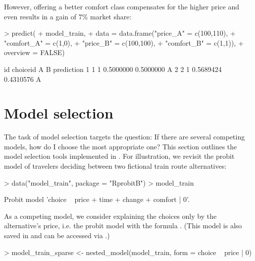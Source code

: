 \documentclass[article]{jss}
\begin{document}
However, offering a better comfort class compensates for the higher price and even results in a gain of 7\% market share:

\begin{Schunk}
\begin{Sinput}
> predict(
+    model_train,
+    data = data.frame("price_A"   = c(100,110),
+                      "comfort_A" = c(1,0),
+                      "price_B"   = c(100,100),
+                      "comfort_B" = c(1,1)),
+    overview = FALSE)
\end{Sinput}
\begin{Soutput}
  id choiceid         A         B prediction
1  1        1 0.5000000 0.5000000          A
2  2        1 0.5689424 0.4310576          A
\end{Soutput}
\end{Schunk}

\section{Model selection} \label{sec:model_selection}

The task of model selection targets the question: If there are several competing models, how do I choose the most appropriate one? This section outlines the model selection tools implemented in . For illustration, we revisit the probit model of travelers deciding between two fictional train route alternatives:

\begin{Schunk}
\begin{Sinput}
> data("model_train", package = "RprobitB")
> model_train
\end{Sinput}
\begin{Soutput}
Probit model 'choice ~ price + time + change + comfort | 0'.
\end{Soutput}
\end{Schunk}

As a competing model, we consider explaining the choices only by the alternative's price, i.e. the probit model with the formula . (This model is also saved in  and can be accessed via .)

\begin{Schunk}
\begin{Sinput}
> model_train_sparse <- nested_model(model_train, form = choice ~ price | 0)
\end{Sinput}
\end{Schunk}
\end{document}
